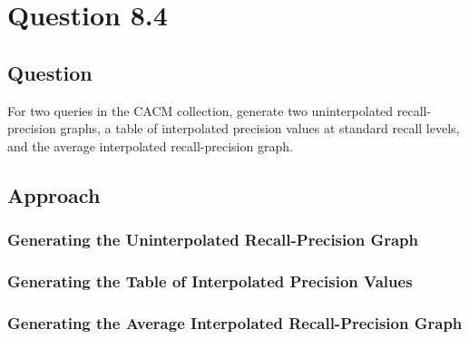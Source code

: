 \section{Question 8.4}


\subsection{Question}
For two queries in the CACM collection, generate two uninterpolated recall-precision graphs, a table of interpolated precision values at standard recall levels, and the average interpolated recall-precision graph.


\subsection{Approach}



\subsubsection{Generating the Uninterpolated Recall-Precision Graph}



\subsubsection{Generating the Table of Interpolated Precision Values}



\subsubsection{Generating the Average Interpolated Recall-Precision Graph}


